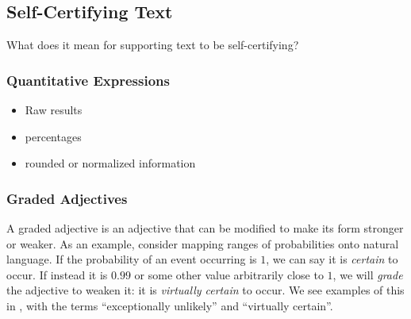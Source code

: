 \subsection{Self-Certifying Text}
What does it mean for supporting text to be self-certifying?

\subsubsection{Quantitative Expressions}
\begin{itemize}
   \item Raw results
   \item percentages
   \item rounded or normalized information
\end{itemize}

\subsubsection{Graded Adjectives}
A graded adjective is an adjective that can be modified to make its form stronger or weaker. As an example,
consider mapping ranges of probabilities onto natural language. If the probability of an event occurring is
$1$, we can say it is \emph{certain} to occur. If instead it is $0.99$ or some other value arbitrarily close
to $1$, we will \emph{grade} the adjective to weaken it: it is \emph{virtually certain} to occur. We see
examples of this in , with the terms ``exceptionally unlikely'' and ``virtually certain''.


